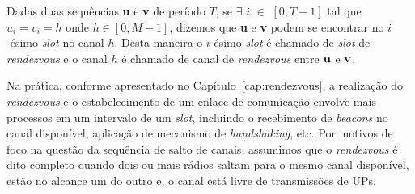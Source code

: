 Dadas duas sequências {\bf u} e {\bf v} de período $T$, se $\exists$ $i$ $\in$ $[0, T-1]$ tal que $u_i = v_i = h$ onde $h \in [0,M-1]$, dizemos que {\bf u} e {\bf v} podem se encontrar no $i$-ésimo {\it slot} no canal $h$. Desta maneira o $i$-ésimo {\it slot} é chamado de {\it slot} de {\it rendezvous} e o canal $h$ é chamado de canal de {\it rendezvous} entre ${\bf u}$ e ${\bf v}$.


Na prática, conforme apresentado no Capítulo~\ref{cap:rendezvous}, a realização do {\it rendezvous} e o estabelecimento de um enlace de comunicação envolve mais processos em um intervalo de um {\it slot}, incluindo o recebimento de {\it beacons} no canal disponível, aplicação de mecanismo de {\it handshaking}, etc. Por motivos de foco na questão da sequência de salto de canais, assumimos que o {\it rendezvous} é dito completo quando dois ou mais rádios saltam para o mesmo canal disponível, estão no alcance um do outro e, o canal está livre de transmissões de UPs. %














